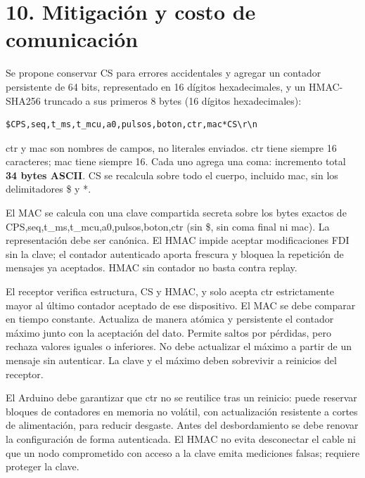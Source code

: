 \documentclass[
  11pt,
]{article}
\begin{document}
\hypertarget{mitigaciuxf3n-y-costo-de-comunicaciuxf3n}{%
\section{10. Mitigación y costo de
comunicación}\label{mitigaciuxf3n-y-costo-de-comunicaciuxf3n}}

Se propone conservar CS para errores accidentales y agregar un contador
persistente de 64 bits, representado en 16 dígitos hexadecimales, y un
HMAC-SHA256 truncado a sus primeros 8 bytes (16 dígitos hexadecimales):

\begin{lstlisting}
$CPS,seq,t_ms,t_mcu,a0,pulsos,boton,ctr,mac*CS\r\n
\end{lstlisting}

ctr y mac son nombres de campos, no literales enviados. ctr tiene
siempre 16 caracteres; mac tiene siempre 16. Cada uno agrega una coma:
incremento total \textbf{34 bytes ASCII}. CS se recalcula sobre todo el
cuerpo, incluido mac, sin los delimitadores \$ y *.

El MAC se calcula con una clave compartida secreta sobre los bytes
exactos de CPS,\allowbreak seq,\allowbreak t\_ms,\allowbreak t\_mcu,\allowbreak a0,\allowbreak pulsos,\allowbreak boton,\allowbreak ctr (sin \$, sin coma
final ni mac). La representación debe ser canónica. El HMAC impide
aceptar modificaciones FDI sin la clave; el contador autenticado aporta
frescura y bloquea la repetición de mensajes ya aceptados. HMAC sin
contador no basta contra replay.

El receptor verifica estructura, CS y HMAC, y solo acepta ctr
estrictamente mayor al último contador aceptado de ese dispositivo. El
MAC se debe comparar en tiempo constante. Actualiza de manera atómica y
persistente el contador máximo junto con la aceptación del dato. Permite
saltos por pérdidas, pero rechaza valores iguales o inferiores. No debe
actualizar el máximo a partir de un mensaje sin autenticar. La clave y
el máximo deben sobrevivir a reinicios del receptor.

El Arduino debe garantizar que ctr no se reutilice tras un reinicio:
puede reservar bloques de contadores en memoria no volátil, con
actualización resistente a cortes de alimentación, para reducir
desgaste. Antes del desbordamiento se debe renovar la configuración de
forma autenticada. El HMAC no evita desconectar el cable ni que un nodo
comprometido con acceso a la clave emita mediciones falsas; requiere
proteger la clave.
\end{document}
